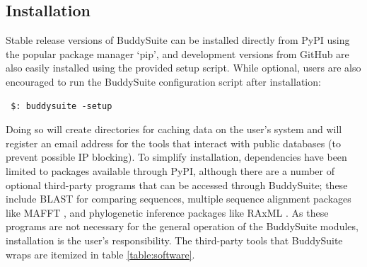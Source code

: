 \documentclass[nogrid]{MBE_article}%
\begin{document}
\subsection{Installation}
Stable release versions of BuddySuite can be installed directly from PyPI using the popular package manager `pip', and development versions from GitHub are also easily installed using the provided setup script. While optional, users are also encouraged to run the BuddySuite configuration script after installation:

\smallskip
{\small
\begin{verbatim}
 $: buddysuite -setup
\end{verbatim}
}
\smallskip
Doing so will create directories for caching data on the user's system and will register an email address for the tools that interact with public databases (to prevent possible IP blocking). To simplify installation, dependencies have been limited to packages available through PyPI, although there are a number of optional third-party programs that can be accessed through BuddySuite; these include BLAST \cite{Camacho2009} for comparing sequences, multiple sequence alignment packages like MAFFT \cite{Katoh:2013hm}, and phylogenetic inference packages like RAxML \cite{Stamatakis:2006de}. As these programs are not necessary for the general operation of the BuddySuite modules, installation is the user's responsibility. The third-party tools that BuddySuite wraps are itemized in table \ref{table:software}.
\end{document}
